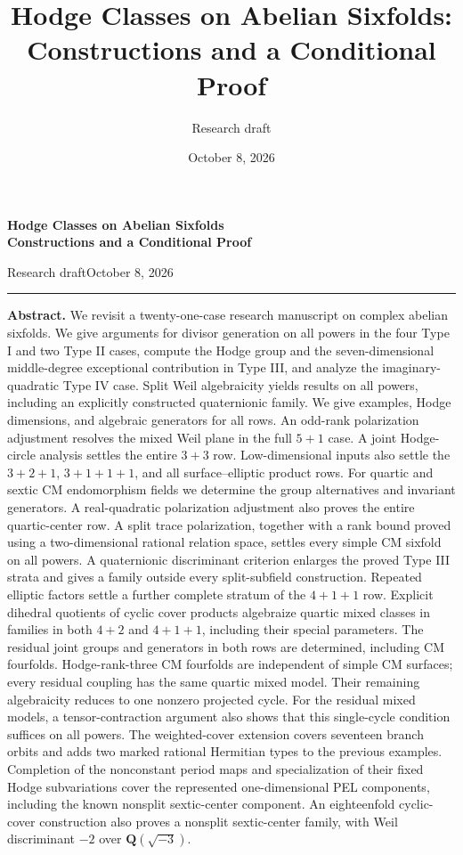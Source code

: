 \documentclass[11pt,reqno]{article}
\title{Hodge Classes on Abelian Sixfolds: Constructions and a Conditional Proof}
\author{Research draft}
\date{October 8, 2026}
\renewcommand{\maketitle}{%
  \thispagestyle{plain}%
  \begingroup\raggedright
  {\fontsize{22}{26}\selectfont\bfseries
  Hodge Classes on Abelian Sixfolds\\
  Constructions and a Conditional Proof\par}
  \vspace{8pt}
  {\small Research draft\hfill October 8, 2026\par}
  \vspace{12pt}\hrule\vspace{14pt}
  \endgroup}
\renewenvironment{abstract}
  {\small\noindent\textbf{Abstract.}\enspace\ignorespaces}
  {\par\vspace{10pt}}
\theoremstyle{emphasizedplain}
\theoremstyle{emphasizeddefinition}
\theoremstyle{emphasizeddefinition}
\newcommand{\Q}{\mathbf Q}
\begin{document}
\maketitle
\begin{abstract}
We revisit a twenty-one-case research manuscript on complex abelian sixfolds.
We give arguments for divisor generation on all powers in the four Type I
and two Type II cases, compute the Hodge group and the seven-dimensional
middle-degree exceptional contribution in Type III, and analyze the
imaginary-quadratic Type IV case. Split Weil algebraicity yields results on
all powers, including an explicitly constructed quaternionic family.
We give examples, Hodge dimensions, and algebraic generators for all rows.
An odd-rank polarization adjustment resolves the mixed Weil plane in
the full $5+1$ case. A joint Hodge-circle analysis settles the entire
$3+3$ row. Low-dimensional inputs also settle the $3+2+1$,
$3+1+1+1$, and all surface--elliptic product rows. For quartic and sextic CM endomorphism fields we determine the group
alternatives and invariant generators. A real-quadratic polarization
adjustment also proves the entire quartic-center row. A split trace
polarization, together with a rank bound proved using a two-dimensional
rational relation space, settles every simple CM sixfold on all powers.
A quaternionic discriminant criterion
enlarges the proved Type III strata and gives a family outside every
split-subfield construction. Repeated elliptic factors settle a further
complete stratum of the $4+1+1$ row. Explicit dihedral quotients of cyclic
cover products algebraize quartic mixed classes in families in both
$4+2$ and $4+1+1$, including their special parameters. The residual
joint groups and generators in both rows are determined, including
CM fourfolds. Hodge-rank-three CM fourfolds are independent of simple
CM surfaces; every residual coupling has the same quartic mixed model.
Their
remaining algebraicity reduces to one nonzero projected cycle.
For the residual mixed models, a tensor-contraction argument also
shows that this single-cycle condition suffices on all powers.
The weighted-cover extension covers seventeen branch orbits and
adds two marked rational Hermitian types to the previous examples.
Completion of the nonconstant period maps and specialization of their
fixed Hodge subvariations cover the represented one-dimensional PEL
components, including the known nonsplit sextic-center component.
An eighteenfold cyclic-cover construction also proves a nonsplit
sextic-center family, with Weil discriminant $-2$ over $\Q(\sqrt{-3})$.

\end{abstract}
\end{document}
